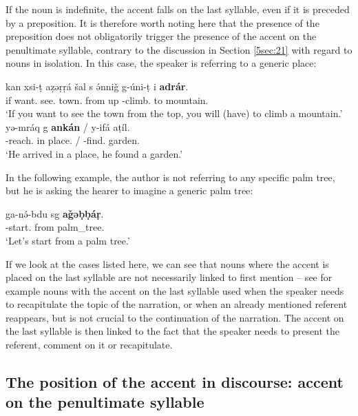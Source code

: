 \documentclass[output=paper]{langsci/langscibook}
\begin{document}
If the noun is indefinite, the accent falls on the last syllable, even if it is preceded by a preposition. It is therefore worth noting here that the presence of the preposition does not obligatorily trigger the presence of the accent on the penultimate syllable, contrary to the discussion in Section \ref{5sec:21} with regard to nouns in isolation. In this case, the speaker is referring to a generic place:

\begin{exe}
\ex\label{5ex:13}
\gll	kan xsi-ṭ aẓəṛṛá šal s ə́nniǧ g-úni-ṭ i {\bf{adrár}}. \\
	if want.{} see.{} town.{} from up {}-climb.{} to mountain.{} \\	
\glt	`If you want to see the town from the top, you will (have) to climb a mountain.'
\ex\label{5ex:14}
\gll	yə-mráq g {\bf{ankán}} / y-ifá	aṭíl. \\
	{}-reach.{} in place.{} / {}-find.{} garden.{} \\
\glt	`He arrived in a place, he found a garden.'
\end{exe}

In the following example, the author is not referring to any specific palm tree, but he is asking the hearer to imagine a generic palm tree:

\begin{exe}
\ex\label{5ex:15}
\gll	ga-nə́-bdu		sg	{\bf{aǧəḅḅáṛ}}. \\
	{}-start.{} from palm\_tree.{} \\
\glt	`Let's start from a palm tree.'
\end{exe}

If we look at the cases listed here, we can see that nouns where the accent is placed on the last syllable are not necessarily linked to first mention -- see for example nouns with the accent on the last syllable used when the speaker needs to recapitulate the topic of the narration, or when an already mentioned referent reappears, but is not crucial to the continuation of the narration. The accent on the last syllable is then linked to the fact that the speaker needs to present the referent, comment on it or recapitulate.


\subsection{The position of the accent in discourse: accent on the penultimate syllable}\label{5sec:23}
\end{document}
